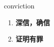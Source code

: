 
\begin{frame}
{\huge conviction}
\begin{center}
\begin{enumerate}\Large
  \item \textbf{深信，确信}
  \item \textbf{证明有罪}
\end{enumerate}
\end{center}
\end{frame}
